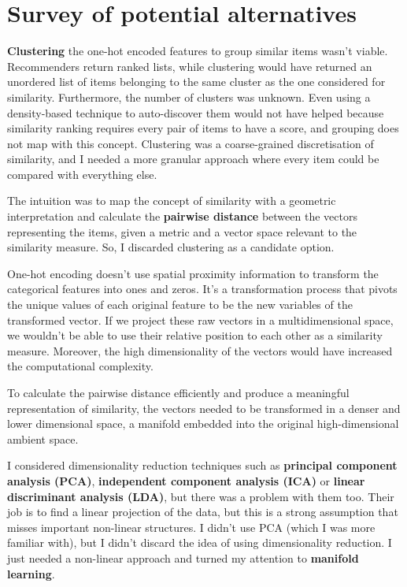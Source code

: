 
\section{Survey of potential alternatives}

\textbf{Clustering} the one-hot encoded features to group similar items wasn't viable.
Recommenders return ranked lists, while clustering would have returned an unordered list of items
belonging to the same cluster as the one considered for similarity.
Furthermore, the number of clusters was unknown.
Even using a density-based technique to auto-discover them would not have helped
because similarity ranking requires every pair of items to have a score,
and grouping does not map with this concept.
Clustering was a coarse-grained discretisation of similarity,
and I needed a more granular approach where every item could be compared with everything else.

The intuition was to map the concept of similarity with a geometric interpretation
and calculate the \textbf{pairwise distance} between the vectors representing the items,
given a metric and a vector space relevant to the similarity measure.
So, I discarded clustering as a candidate option.

One-hot encoding doesn't use spatial proximity information to transform the categorical features into ones and zeros.
It's a transformation process that pivots the unique values of each original feature to be the new variables of the transformed vector.
If we project these raw vectors in a multidimensional space, we wouldn't be able to use their
relative position to each other as a similarity measure. Moreover, the high dimensionality of the vectors would have increased
the computational complexity.

To calculate the pairwise distance efficiently and produce a meaningful representation of similarity,
the vectors needed to be transformed in a denser and lower dimensional space,
a manifold embedded into the original high-dimensional ambient space.

I considered dimensionality reduction techniques such as \textbf{principal component analysis (PCA)},
\textbf{independent component analysis (ICA)} or \textbf{linear discriminant analysis (LDA)},
but there was a problem with them too.
Their job is to find a linear projection of the data,
but this is a strong assumption that misses important non-linear structures.
I didn't use PCA (which I was more familiar with),
but I didn't discard the idea of using dimensionality reduction.
I just needed a non-linear approach and turned my attention to \textbf{manifold learning}.

